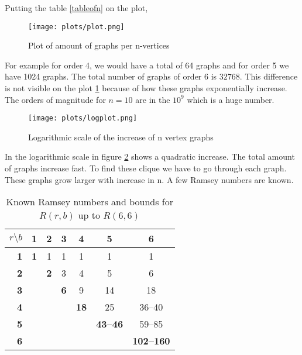 \documentclass{Assignment}
\begin{document}
Putting the table \ref{tableofn} on the plot,
\begin{figure}[H]
	\centering
	\texttt{[image: plots/plot.png]}
	\caption{Plot of amount of graphs per n-vertices}
	\label{plot}
\end{figure}
For example for order 4, we would have a total of 64 graphs and for order 5 we have 1024 graphs.
The total number of graphs of order 6 is $32768$.
This difference is not visible on the plot \ref{plot} because of how these graphs exponentially increase.
The orders of magnitude for $n= 10$ are in the $10^{9}$ which is a huge number.
\begin{figure}[H]
	\centering
	\texttt{[image: plots/logplot.png]}
	\caption{Logarithmic scale of the increase of n vertex graphs}
	\label{logplot}
\end{figure}
In the logarithmic scale in figure \ref{logplot} shows a quadratic increase.
The total amount of graphs increase fast.
To find these clique we have to go through each graph.
These graphs grow larger with increase in n.
A few Ramsey numbers are known.
\begin{table}[H]
	\centering

	\label{tab:ramsey_matrix_upto_6_6}
	\begin{adjustbox}{max width=\textwidth} 
		\begin{tabular}{| r | c | c | c | c | c | c |} 
			\toprule
			\multicolumn{1}{|c|}{$r \setminus b$} & 1 & 2 & 3 & 4 & 5 & 6 \\
			\midrule
			\textbf{1} & \textbf{1} & 1 & 1 & 1 & 1 & 1 \\\hline
			\textbf{2} & & \textbf{2} & 3 & 4 & 5 & 6 \\\hline
			\textbf{3} & & & \textbf{6} & 9 & 14 & 18 \\\hline
			\textbf{4} & & & & \textbf{18} & 25 & 36--40 \\\hline
			\textbf{5} & & & & & \textbf{43--46} & 59--85 \\\hline
			\textbf{6} & & & & & & \textbf{102--160} \\
			\bottomrule
		\end{tabular}
	\end{adjustbox}
	\vspace{0.5cm}
	\small 	\caption{ Known Ramsey numbers and bounds for $R(r,b)$  up to $R(6,6)$ \cite{GreenwoodGleason1955}}
\end{table}
\end{document}
